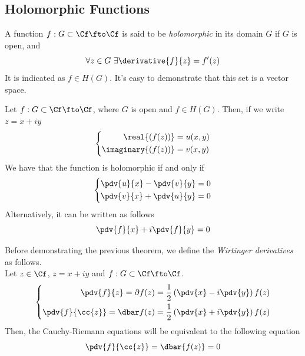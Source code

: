 \documentclass[../mmf.tex]{subfiles}
\begin{document}
\subsection{Holomorphic Functions}
\begin{dfn}
	A function $f:G\subset\Cf\fto\Cf$ is said to be \textit{holomorphic} in its domain $G$ if $G$ is open, and
	\begin{equation}
		\forall{z}\in G\ \exists\derivative{f}{z}=f'(z)
		\label{eq:holomorphicfc}
	\end{equation}
	It is indicated as $f\in H(G)$. It's easy to demonstrate that this set is a vector space.
\end{dfn}
\begin{thm}
	Let $f:G\subset\Cf\fto\Cf$, where $G$ is open and $f\in H(G)$. Then, if we write $z=x+iy$
	\begin{equation}
		\left\{ \begin{aligned}
				\real{(f(z))}&=u(x,y)\\
				\imaginary{(f(z))}&=v(x,y)
		\end{aligned}\right.
		\label{eq:defnrealimf}
	\end{equation}
	We have that the function is holomorphic if and only if
	\begin{equation}
		\left\{ \begin{aligned}
				\pdv{u}{x}-\pdv{v}{y}&=0\\
				\pdv{v}{x}+\pdv{u}{y}&=0
		\end{aligned}\right.
		\label{eq:cauchyriemann}
	\end{equation}
	Alternatively, it can be written as follows
	\begin{equation}
		\pdv{f}{x}+i\pdv{f}{y}=0
		\label{eq:wirtingercr}
	\end{equation}
\end{thm}
\begin{dfn}
	Before demonstrating the previous theorem, we define the \textit{Wirtinger derivatives} as follows.\\
	Let $z\in\Cf$, $z=x+iy$ and $f:G\subset\Cf\fto\Cf$.
	\begin{equation}
		\left\{ \begin{aligned}
				\pdv{f}{z}=\partial f(z)&=\frac{1}{2}\left( \pdv{x}-i\pdv{y} \right)f(z)\\
				\pdv{f}{\cc{z}}=\dbar f(z)&=\frac{1}{2}\left( \pdv{x}+i\pdv{y} \right)f(z)
		\end{aligned}\right.
		\label{eq:wirtingerder}
	\end{equation}
	Then, the Cauchy-Riemann equations will be equivalent to the following equation
	\begin{equation}
		\pdv{f}{\cc{z}}=\dbar{f(z)}=0
		\label{eq:crwirtinger}
	\end{equation}
\end{dfn}
\end{document}
